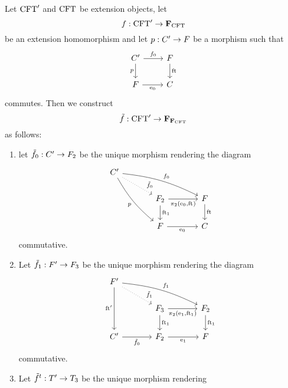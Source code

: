 \begin{defn}
Let $\mathrm{CFT}'$ and $\mathrm{CFT}$ be extension objects, let
\begin{equation*}
f : \mathrm{CFT}'\to\mathbf{F}_{\mathrm{CFT}}
\end{equation*}
be an extension homomorphism and let $p:C'\to F$ be a morphism
such that
\begin{equation*}
\begin{tikzcd}
\stesysc'
  \ar{r}{f_0}
  \ar{d}[swap]{p}
  &
\stesysf
  \ar{d}{\eft}
  \\
\stesysf
  \ar{r}[swap]{\ectxext}
  &
\stesysc
\end{tikzcd}
\end{equation*}
commutes. Then we construct
\begin{equation*}
\tilde{f}:\mathrm{CFT}'\to\mathbf{F}_{\mathbf{F}_{\mathrm{CFT}}}
\end{equation*}
as follows:
\begin{enumerate}
\item let $\tilde{f}_0:C'\to F_2$ be the unique morphism rendering
the diagram
\begin{equation*}
\begin{tikzcd}[column sep=large]
\stesysc' 
  \ar[bend left=10]{rrd}{f_0}
  \ar[swap,bend right=10]{ddr}{p}
  \ar[dotted]{dr}[near end]{\tilde{f}_0}
  \\
  {}&
\stesysf_2
  \ar{r}[swap]{\pullbackpr{2}{\ectxext}{\eft}}
  \ar{d}{\eft[1]}
  &
\stesysf
  \ar{d}{\eft}
  \\
  {}&
\stesysf
  \ar{r}[swap]{\ectxext}
  &
\stesysc
\end{tikzcd}
\end{equation*}
commutative.
\item Let $\tilde{f}_1:F'\to F_3$ be the unique morphism rendering
the diagram
\begin{equation*}
\begin{tikzcd}[column sep=large]
\stesysf'
  \ar[bend left=10]{drr}{f_1}
  \ar[swap]{dd}{\eft'}
  \ar[dotted]{dr}[near end]{\tilde{f}_1}
  \\
  {}&
\stesysf_3
  \ar{r}[swap]{\pullbackpr{2}{\efamext}{\eft[1]}}
  \ar{d}{\eft[1]}
  &
\stesysf_2
  \ar{d}{\eft[1]}
  \\
\stesysc'
  \ar{r}[swap]{\tilde{f}_0}
  &
\stesysf_2
  \ar{r}[swap]{\efamext}
  &
\stesysf
\end{tikzcd}
\end{equation*}
commutative.
\item Let $\tilde{f}^t:T'\to T_3$ be the unique morphism rendering

\end{enumerate}
\end{defn}
